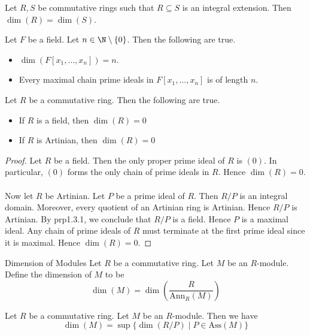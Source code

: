 \documentclass[a4paper]{article}
\begin{document}
\begin{lmm}{}{} Let $R,S$ be commutative rings such that $R\subseteq S$ is an integral extension. Then $\dim(R)=\dim(S)$. 
\end{lmm}

\begin{prp}{}{} Let $F$ be a field. Let $n\in\N\setminus\{0\}$. Then the following are true. 
\begin{itemize}
\item $\dim(F[x_1,\dots,x_n])=n$. 
\item Every maximal chain prime ideals in $F[x_1,\dots,x_n]$ is of length $n$. 
\end{itemize}
\end{prp}

\begin{lmm}{}{} Let $R$ be a commutative ring. Then the following are true. 
\begin{itemize}
\item If $R$ is a field, then $\dim(R)=0$
\item If $R$ is Artinian, then $\dim(R)=0$
\end{itemize} \tcbline
\begin{proof}
Let $R$ be a field. Then the only proper prime ideal of $R$ is $(0)$. In particular, $(0)$ forms the only chain of prime ideals in $R$. Hence $\dim(R)=0$. \\~\\

Now let $R$ be Artinian. Let $P$ be a prime ideal of $R$. Then $R/P$ is an integral domain. Moreover, every quotient of an Artinian ring is Artinian. Hence $R/P$ is Artinian. By prp1.3.1, we conclude that $R/P$ is a field. Hence $P$ is a maximal ideal. Any chain of prime ideals of $R$ must terminate at the first prime ideal since it is maximal. Hence $\dim(R)=0$. 
\end{proof}
\end{lmm}

\begin{defn}{Dimension of Modules}{} Let $R$ be a commutative ring. Let $M$ be an $R$-module. Define the dimension of $M$ to be $$\dim(M)=\dim\left(\frac{R}{\text{Ann}_R(M)}\right)$$
\end{defn}

\begin{prp}{}{} Let $R$ be a commutative ring. Let $M$ be an $R$-module. Then we have $$\dim(M)=\sup\{\dim(R/P)\;|\;P\in\text{Ass}(M)\}$$
\end{prp}
\end{document}
